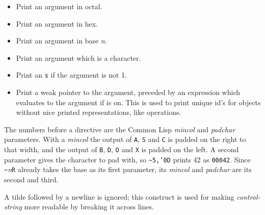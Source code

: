 {\begin{itemize}
\item[\texttt{O}] Print an argument in octal.

\item[\texttt{X}] Print an argument in hex.

\item[\texttt{\emph{n}R}] Print an argument in base \emph{n}.

\item[\texttt{C}] Print an argument which is a character.

\item[\texttt{P}] Print an \texttt{s} if the argument is not 1.

\item[\texttt{!}] Print a weak pointer to the argument, preceded by an
expression which evaluates to the argument if 
is on.  This is used to print unique id's for objects without nice
printed representations, like operations.

\end{itemize}

The numbers before a directive are the Common Lisp \emph{mincol} and
\emph{padchar} parameters.  With a \emph{mincol} the output of
\texttt{A}, \texttt{S} and \texttt{C} is padded on the right to that
width, and the output of \texttt{B}, \texttt{D}, \texttt{O} and
\texttt{X} is padded on the left.  A second parameter gives the
character to pad with, so \texttt{\~}\texttt{5,'0D} prints 42 as
\texttt{00042}.  Since \texttt{\~}\emph{n}\texttt{R} already takes the
base as its first parameter, its \emph{mincol} and \emph{padchar} are
its second and third.

A tilde followed by a newline is ignored; this construct is used for
making \emph{control-string} more readable by breaking it across lines.}






